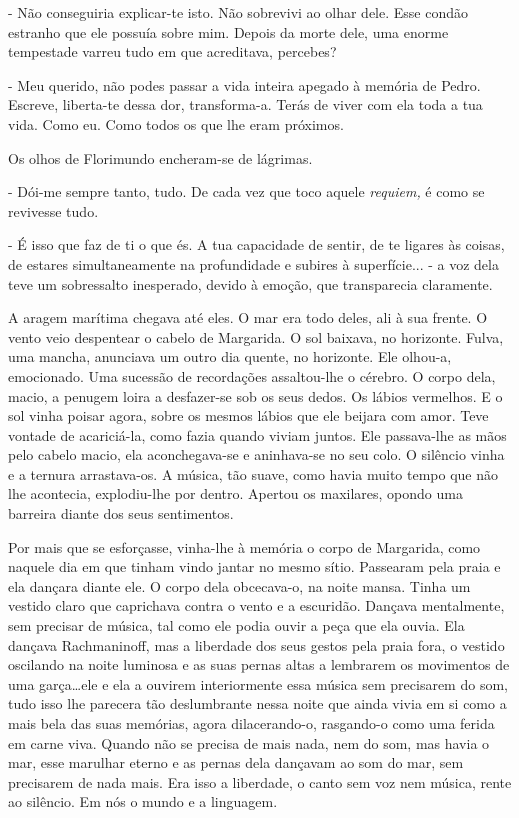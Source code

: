 - Não conseguiria explicar-te isto. Não sobrevivi ao olhar dele. Esse
condão estranho que ele possuía sobre mim. Depois da morte dele, uma
enorme tempestade varreu tudo em que acreditava, percebes?

- Meu querido, não podes passar a vida inteira apegado à memória de
Pedro. Escreve, liberta-te dessa dor, transforma-a. Terás de viver com
ela toda a tua vida. Como eu. Como todos os que lhe eram próximos.

Os olhos de Florimundo encheram-se de lágrimas.

- Dói-me sempre tanto, tudo. De cada vez que toco aquele \emph{requiem,}
é como se revivesse tudo.

- É isso que faz de ti o que és. A tua capacidade de sentir, de te
ligares às coisas, de estares simultaneamente na profundidade e subires
à superfície... - a voz dela teve um sobressalto inesperado, devido à
emoção, que transparecia claramente.

A aragem marítima chegava até eles. O mar era todo deles, ali à sua
frente. O vento veio despentear o cabelo de Margarida. O sol baixava, no
horizonte. Fulva, uma mancha, anunciava um outro dia quente, no
horizonte. Ele olhou-a, emocionado. Uma sucessão de recordações
assaltou-lhe o cérebro. O corpo dela, macio, a penugem loira a
desfazer-se sob os seus dedos. Os lábios vermelhos. E o sol vinha poisar
agora, sobre os mesmos lábios que ele beijara com amor. Teve vontade de
acariciá-la, como fazia quando viviam juntos. Ele passava-lhe as mãos
pelo cabelo macio, ela aconchegava-se e aninhava-se no seu colo. O
silêncio vinha e a ternura arrastava-os. A música, tão suave, como havia
muito tempo que não lhe acontecia, explodiu-lhe por dentro. Apertou os
maxilares, opondo uma barreira diante dos seus sentimentos.

Por mais que se esforçasse, vinha-lhe à memória o corpo de Margarida,
como naquele dia em que tinham vindo jantar no mesmo sítio. Passearam
pela praia e ela dançara diante ele. O corpo dela obcecava-o, na noite
mansa. Tinha um vestido claro que caprichava contra o vento e a
escuridão. Dançava mentalmente, sem precisar de música, tal como ele
podia ouvir a peça que ela ouvia. Ela dançava Rachmaninoff, mas a
liberdade dos seus gestos pela praia fora, o vestido oscilando na noite
luminosa e as suas pernas altas a lembrarem os movimentos de uma
garça\ldots{}ele e ela a ouvirem interiormente essa música sem
precisarem do som, tudo isso lhe parecera tão deslumbrante nessa noite
que ainda vivia em si como a mais bela das suas memórias, agora
dilacerando-o, rasgando-o como uma ferida em carne viva. Quando não se
precisa de mais nada, nem do som, mas havia o mar, esse marulhar eterno
e as pernas dela dançavam ao som do mar, sem precisarem de nada mais.
Era isso a liberdade, o canto sem voz nem música, rente ao silêncio. Em
nós o mundo e a linguagem.

